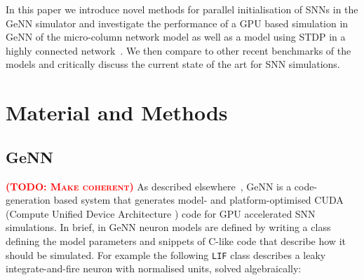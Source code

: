 \documentclass[utf8]{frontiersSCNS} %
\newcommand{\todo}[1]{\textbf{\textsc{\textcolor{red}{(TODO: #1)}}}}
\begin{document}
In this paper we introduce novel methods for parallel initialisation of SNNs in the GeNN simulator and investigate the performance of a GPU based simulation in GeNN of the micro-column network model \cite{Potjans2012,VanAlbada2018} as well as a model using STDP in a highly connected network~\citep{Morrison2007}. We then compare to other recent benchmarks of the models \citep{VanAlbada2018} and critically discuss the current state of the art for SNN simulations.

\section{Material and Methods}
\label{sec:method}
\subsection{GeNN}
\label{sec:method/genn}
\todo{Make coherent}
As described elsewhere~\cite{Yavuz2016}, GeNN is a code-generation based system that generates model- and platform-optimised CUDA (Compute Unified Device Architecture \cite{CUDA}) code for GPU accelerated SNN simulations.
In brief, in GeNN neuron models are defined by writing a class defining the model parameters and snippets of C-like code that describe how it should be simulated.
For example the following \lstinline{LIF} class describes a leaky integrate-and-fire neuron with normalised units, solved algebraically:


\end{document}
